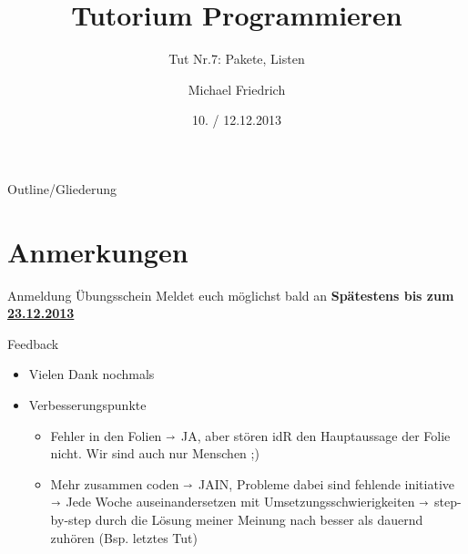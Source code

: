\documentclass[18pt]{beamer}
\title[Prog Tut Nr. 7]{Tutorium Programmieren}
\subtitle{Tut Nr.7: Pakete, Listen}
\author{Michael Friedrich}
\date{10. / 12.12.2013}
\institute{Institut f\"ur theoretische Informatik}
\begin{document}

\begin{frame}
	\titlepage
\end{frame}

\begin{frame}{Outline/Gliederung}
	\tableofcontents
\end{frame}

\section{Anmerkungen}
\begin{frame}{Anmeldung Übungsschein}
	Meldet euch möglichst bald an \newline
	\vspace{2cm}
	\huge \textbf{Spätestens bis zum \underline{23.12.2013}}
\end{frame}

\begin{frame}[fragile]{Feedback}
\begin{itemize}
	\item Vielen Dank nochmals\pause
	\vspace{1cm}
	\item Verbesserungspunkte\pause
	
	\begin{itemize}
		\item Fehler in den Folien \pause
		$\shortrightarrow$ JA, aber stören idR den Hauptaussage der Folie nicht. Wir sind auch nur Menschen ;) \pause
		\item Mehr zusammen coden \newline \pause
		$\shortrightarrow$ JAIN, Probleme dabei sind fehlende initiative \newline \pause
		$\shortrightarrow$ Jede Woche auseinandersetzen mit Umsetzungsschwierigkeiten \newline \pause
		$\shortrightarrow$ step-by-step durch die Lösung meiner Meinung nach besser als dauernd zuhören (Bsp. letztes Tut)
	\end{itemize}
\end{itemize}
\end{frame}
\end{document}
